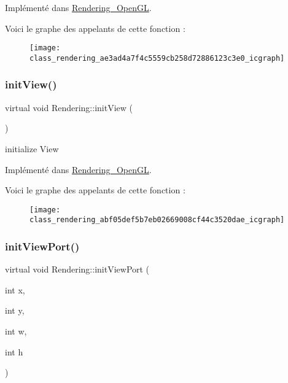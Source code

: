 Implémenté dans \hyperlink{class_rendering___open_g_l_a2df315de627ccedc056c5834e65bda6d}{Rendering\+\_\+\+Open\+GL}.

Voici le graphe des appelants de cette fonction \+:\nopagebreak
\begin{figure}[H]
\begin{center}
\leavevmode
\texttt{[image: class\_rendering\_ae3ad4a7f4c5559cb258d72886123c3e0\_icgraph]}
\end{center}
\end{figure}
\mbox{\label{class_rendering_abf05def5b7eb02669008cf44c3520dae}} 
\subsubsection{\texorpdfstring{init\+View()}{initView()}}
{\footnotesize\ttfamily virtual void Rendering\+::init\+View (\begin{DoxyParamCaption}{ }\end{DoxyParamCaption})\hspace{0.3cm}{\ttfamily [pure virtual]}}



initialize View 



Implémenté dans \hyperlink{class_rendering___open_g_l_aa41657730fef1c0034233a9977a31531}{Rendering\+\_\+\+Open\+GL}.

Voici le graphe des appelants de cette fonction \+:\nopagebreak
\begin{figure}[H]
\begin{center}
\leavevmode
\texttt{[image: class\_rendering\_abf05def5b7eb02669008cf44c3520dae\_icgraph]}
\end{center}
\end{figure}
\mbox{\label{class_rendering_a87a6dd12561315a07ec111ea2939a3c2}} 
\subsubsection{\texorpdfstring{init\+View\+Port()}{initViewPort()}}
{\footnotesize\ttfamily virtual void Rendering\+::init\+View\+Port (\begin{DoxyParamCaption}\item[{int}]{x,  }\item[{int}]{y,  }\item[{int}]{w,  }\item[{int}]{h }\end{DoxyParamCaption})\hspace{0.3cm}{\ttfamily [pure virtual]}}



